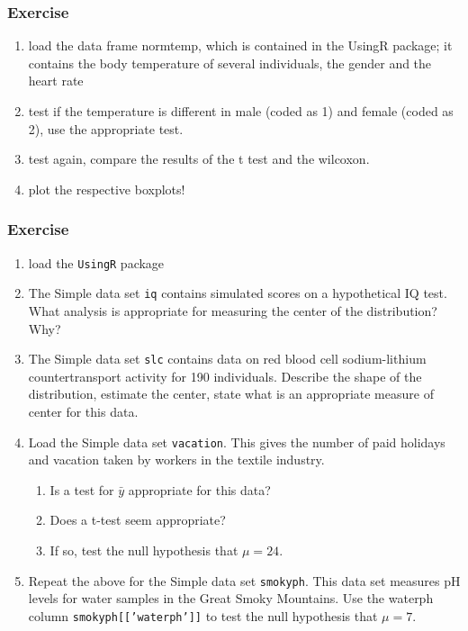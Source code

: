 \documentclass[xcolor={table},handout]{beamer}
\begin{document}
\begin{frame}\frametitle{Exercise}
  \begin{enumerate}
  \item load the data frame normtemp, which is contained in the UsingR package; it contains the body temperature of several individuals, the gender and the heart rate
  \item test if the temperature is different in male (coded as 1) and female (coded as 2), use the appropriate test.
  \item test again, compare the results of the t test and the wilcoxon.
  \item plot the respective boxplots!
  \end{enumerate}
\end{frame}

\begin{frame}[allowframebreaks]\frametitle{Exercise}
  \begin{enumerate}
  \item load the \texttt{UsingR} package
  \item The Simple data set \texttt{iq} contains simulated scores on a hypothetical IQ test. What analysis is appropriate for measuring the center of the distribution? Why?
  \item The Simple data set \texttt{slc} contains data on red blood cell sodium-lithium countertransport activity for 190 individuals. Describe the shape of the distribution, estimate the center, state what is an appropriate measure of center for this data.
  \item  Load the Simple data set \texttt{vacation}. This gives the number of paid holidays and vacation taken by workers in
    the textile industry.
    \begin{enumerate}
    \item Is a test for $\bar{y}$ appropriate for this data?
    \item Does a t-test seem appropriate?
    \item If so, test the null hypothesis that $\mu = 24$. 
    \end{enumerate}
  \item  Repeat the above for the Simple data set \texttt{smokyph}. This data set measures pH levels for water samples in the Great Smoky Mountains. Use the waterph column \texttt{smokyph[[’waterph’]]} to test the null hypothesis that
    $\mu = 7$. 
  \end{enumerate}
\end{frame}
\end{document}
